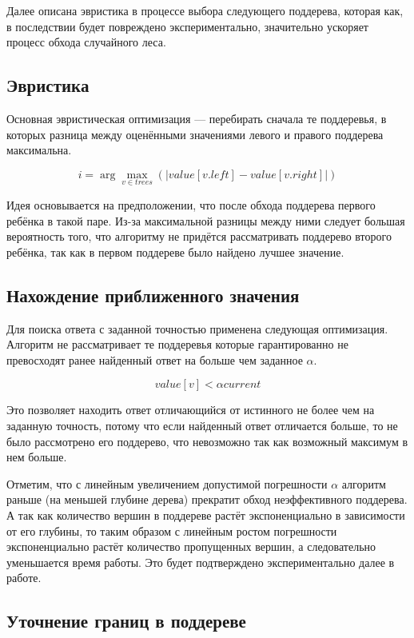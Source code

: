 Далее описана эвристика в процессе выбора следующего поддерева, которая как,
в последствии будет повреждено экспериментально, значительно ускоряет процесс
обхода случайного леса.

\subsection{Эвристика}

Основная эвристическая оптимизация --- перебирать сначала те поддеревья,
в которых разница между оценёнными значениями левого и правого поддерева
максимальна.

\[
    i = \arg \max_{v \in trees}(|value[v.left] - value[v.right]|)
\]

Идея основывается на предположении, что после обхода поддерева первого ребёнка
в такой паре. Из-за максимальной разницы между ними следует большая вероятность
того, что алгоритму не придётся рассматривать поддерево второго ребёнка, так как
в первом поддереве было найдено лучшее значение.

\subsection{Нахождение приближенного значения}

Для поиска ответа с заданной точностью применена следующая оптимизация. Алгоритм
не рассматривает те поддеревья которые гарантированно не превосходят ранее
найденный ответ на больше чем заданное $\alpha$.

\[
    value[v] < \alpha current
\]

Это позволяет находить ответ отличающийся от истинного не более чем на заданную
точность, потому что если найденный ответ отличается больше, то не было
рассмотрено его поддерево, что невозможно так как возможный максимум в нем
больше.

Отметим, что с линейным увеличением допустимой погрешности $\alpha$ алгоритм
раньше (на меньшей глубине дерева) прекратит обход неэффективного поддерева.
А так как количество вершин в поддереве растёт экспоненциально в зависимости от
его глубины, то таким образом с линейным ростом погрешности экспоненциально
растёт количество пропущенных вершин, а следовательно уменьшается время работы.
Это будет подтверждено экспериментально далее в работе.

\subsection{Уточнение границ в поддереве}

